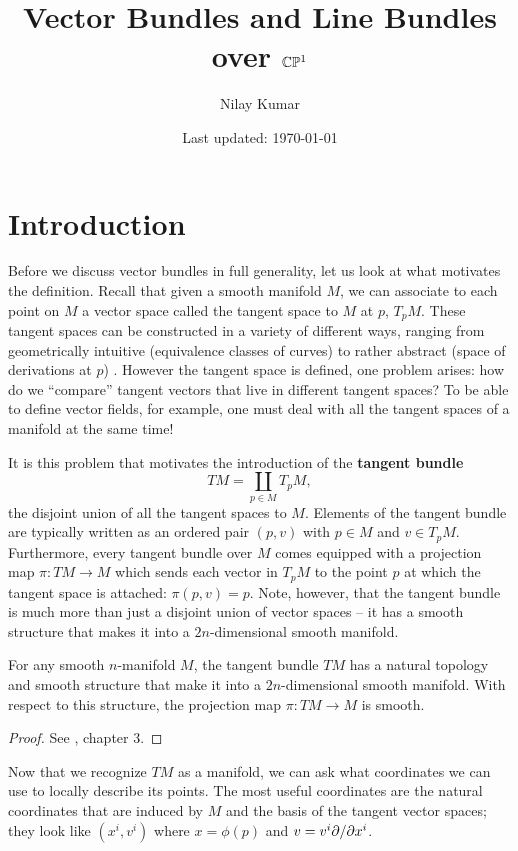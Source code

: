 \documentclass{../../mathnotes}
\title{Vector Bundles and Line Bundles over $\mathbb{C}\mathbb{P}^1$}
\author{Nilay Kumar}
\date{Last updated: \today}
\begin{document}
\maketitle

\setcounter{section}{-1}

\section{Introduction}

Before we discuss vector bundles in full generality, let us look at what motivates the definition. Recall that given a smooth
manifold $M$, we can associate to each point on $M$ a vector space called the tangent space to $M$ at $p$, $T_pM$. These tangent
spaces can be constructed in a variety of different ways, ranging from geometrically intuitive (equivalence classes of curves)
to rather abstract (space of derivations at $p$) \cite{lee12}. However the tangent space is defined, one problem arises: how do we ``compare''
tangent vectors that live in different tangent spaces? To be able to define vector fields, for example, one must deal with
all the tangent spaces of a manifold at the same time!

It is this problem that motivates the introduction of the \textbf{tangent bundle}
\[TM=\coprod_{p\in M} T_pM,\]
the disjoint union of all the tangent spaces to $M$. Elements of the tangent bundle are typically written as an ordered pair
$(p,v)$ with $p\in M$ and $v\in T_pM$. Furthermore, every tangent bundle over $M$ comes equipped with a projection map
$\pi:TM\to M$ which sends each vector in $T_pM$ to the point $p$ at which the tangent space is attached: $\pi(p,v)=p$.
Note, however, that the tangent bundle is much more than just a disjoint union of vector spaces -- it has a smooth structure
that makes it into a $2n$-dimensional smooth manifold.

\begin{thm}
    For any smooth $n$-manifold $M$, the tangent bundle $TM$ has a natural topology and smooth structure that make it into
    a $2n$-dimensional smooth manifold. With respect to this structure, the projection map $\pi:TM\to M$ is smooth.
\end{thm}
\begin{proof}
    See \cite{lee12}, chapter 3.
\end{proof}

Now that we recognize $TM$ as a manifold, we can ask what coordinates we can use to locally describe its points. The most useful
coordinates are the natural coordinates that are induced by $M$ and the basis of the tangent vector spaces; they look like $(x^i,v^i)$
where $x=\phi(p)$ and $v=v^i\partial/\partial x^i$.
\end{document}

